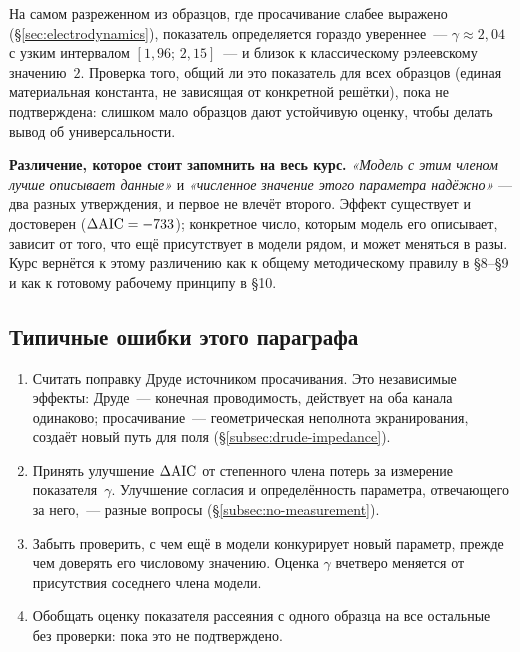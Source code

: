 \begin{example}
На самом разреженном из образцов, где просачивание слабее выражено (§\ref{sec:electrodynamics}),
показатель определяется гораздо увереннее~--- $\gamma\approx2{,}04$ с узким интервалом
$[1{,}96;\,2{,}15]$~--- и близок к классическому рэлеевскому значению~$2$. Проверка того, общий ли
это показатель для всех образцов (единая материальная константа, не зависящая от конкретной
решётки), пока не подтверждена: слишком мало образцов дают устойчивую оценку, чтобы делать вывод
об универсальности.
\end{example}

\begin{tcolorbox}[enhanced,colback=cS1!7,colframe=cS1,boxrule=0pt,leftrule=3pt,arc=1pt]
\textbf{Различение, которое стоит запомнить на весь курс.} \emph{«Модель с этим членом лучше
описывает данные»} и \emph{«численное значение этого параметра надёжно»} — два разных
утверждения, и первое не влечёт второго. Эффект существует и достоверен ($\Delta\mathrm{AIC}=-733$); конкретное
число, которым модель его описывает, зависит от того, что ещё присутствует в модели рядом, и может
меняться в разы. Курс вернётся к этому различению как к общему методическому правилу в §8--§9 и как
к готовому рабочему принципу в §10.
\end{tcolorbox}

\subsection{Типичные ошибки этого параграфа}

\begin{enumerate}[leftmargin=1.6em,itemsep=0.25em]
  \item Считать поправку Друде источником просачивания. Это независимые эффекты: Друде~---
        конечная проводимость, действует на оба канала одинаково; просачивание~--- геометрическая
        неполнота экранирования, создаёт новый путь для поля (§\ref{subsec:drude-impedance}).
  \item Принять улучшение $\Delta\mathrm{AIC}$ от степенного члена потерь за измерение показателя~$\gamma$.
        Улучшение согласия и определённость параметра, отвечающего за него,~--- разные вопросы
        (§\ref{subsec:no-measurement}).
  \item Забыть проверить, с чем ещё в модели конкурирует новый параметр, прежде чем доверять его
        числовому значению. Оценка $\gamma$ вчетверо меняется от присутствия соседнего члена
        модели.
  \item Обобщать оценку показателя рассеяния с одного образца на все остальные без проверки: пока
        это не подтверждено.
\end{enumerate}

\clearpage
